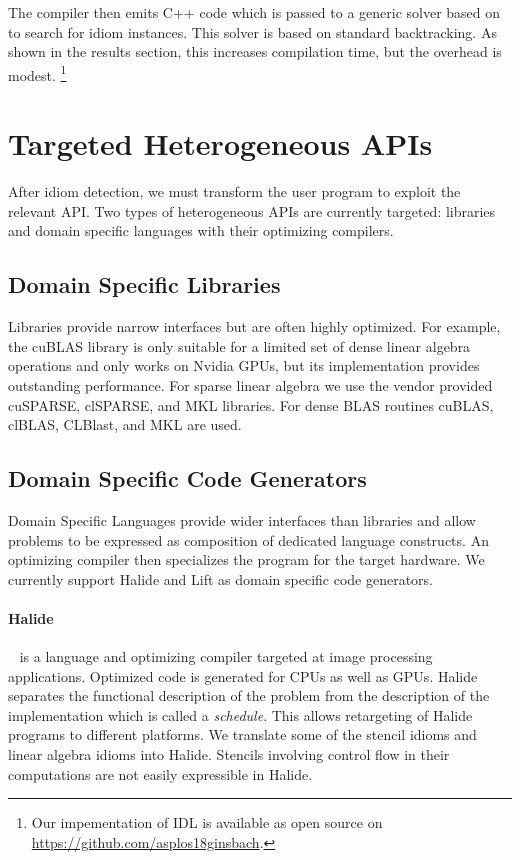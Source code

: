 The compiler then emits C++ code which is passed to a generic solver based on \cite{ginsbach2017discovery} to search for idiom instances.
This solver is based on standard backtracking.
As shown in the results section, this increases compilation time, but the overhead is modest. 
\footnote{Our impementation of IDL is available as open source on \url{https://github.com/asplos18ginsbach}.}

\section{Targeted Heterogeneous APIs}

    After idiom detection, we must transform the user program to exploit the
    relevant API.
    Two types of heterogeneous APIs are currently targeted: libraries and domain
    specific languages with their optimizing compilers.

    \subsection{Domain Specific Libraries}
    Libraries provide narrow interfaces but are often highly optimized.
    For example, the cuBLAS library is only suitable for a limited set of dense
    linear algebra operations and only works on Nvidia GPUs, but its
    implementation provides outstanding performance.
    For sparse linear algebra we use the vendor provided cuSPARSE, clSPARSE, and
    MKL libraries.
    For dense BLAS routines cuBLAS, clBLAS, CLBlast, and MKL are used.

    \subsection{Domain Specific Code Generators}
    Domain Specific Languages provide wider interfaces than libraries and allow
    problems to be expressed as composition of dedicated language constructs.
    An optimizing compiler then specializes the program for the target hardware.
    We currently support Halide and Lift as domain specific code generators.

    \paragraph{Halide}~\cite{Ragan-Kelley2013Halide} is a language and
    optimizing compiler targeted at image processing applications.
    Optimized code is generated for CPUs as well as GPUs.
    Halide separates the functional description of the problem from the
    description of the implementation which is called a \emph{schedule}.
    This allows retargeting of Halide programs to different platforms.
    We translate some of the stencil idioms and linear algebra idioms into
    Halide.
    Stencils involving control flow in their computations are not easily
    expressible in Halide.

